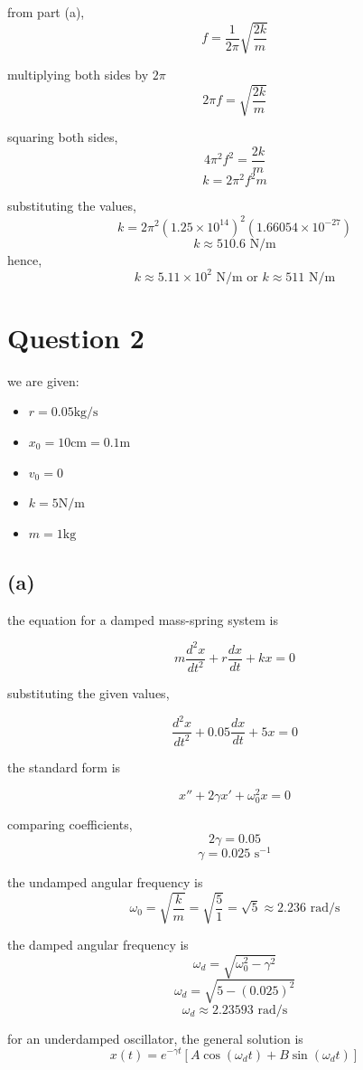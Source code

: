 \documentclass{article}
\begin{document}
from part (a),
\[
f=\frac{1}{2\pi}\sqrt{\frac{2k}{m}}
\]

multiplying both sides by $2\pi$
\[
2\pi f=\sqrt{\frac{2k}{m}}
\]

squaring both sides,
\[
4\pi^2f^2=\frac{2k}{m}
\]
\[
k=2\pi^2f^2m
\]

substituting the values,
\[
k = 2\pi^2 (1.25\times10^{14})^2 (1.66054\times10^{-27})
\]
\[
k\approx510.6\text{ N/m}
\]
hence, 
\[
\boxed{k\approx5.11\times10^2\text{ N/m} \text{ or } k\approx511\text{ N/m}}
\]

\section{Question 2}

we are given:
\begin{itemize}
    \item $r=0.05\text{kg/s}$
    \item $x_0=10\text{cm} = 0.1\text{m}$
    \item $v_0=0$
    \item $k=5\text{N/m}$
    \item $m=1\text{kg}$
\end{itemize}

\subsection*{(a)}

the equation for a damped mass-spring system is

\[
m\frac{d^2x}{dt^2} + r\frac{dx}{dt} + kx=0
\]

substituting the given values,

\[
\frac{d^2x}{dt^2} + 0.05\frac{dx}{dt} + 5x=0
\]

the standard form is

\[
x''+2\gamma x'+\omega_0^2x=0
\]

comparing coefficients,
\[
2\gamma=0.05
\]
\[
\gamma=0.025\text{ s}^{-1}
\]

the undamped angular frequency is
\[
\omega_0=\sqrt{\frac{k}{m}} = \sqrt{\frac{5}{1}} = \sqrt{5} \approx2.236\text{ rad/s}
\]

the damped angular frequency is
\[
\omega_d=\sqrt{\omega_0^2-\gamma^2}
\]
\[
\omega_d=\sqrt{5-(0.025)^2}\]
\[
\omega_d \approx2.23593\text{ rad/s}
\]

for an underdamped oscillator, the general solution is
\[
x(t)=e^{-\gamma t}\left[A\cos(\omega_dt)+B\sin(\omega_dt)\right]
\]
\end{document}
